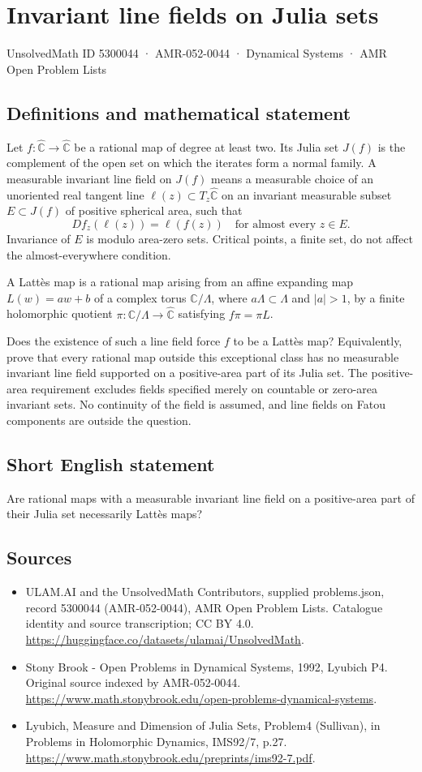 \documentclass[11pt,a4paper]{article}
\begin{document}
\section*{Invariant line fields on Julia sets}\label{5300044}
{\small UnsolvedMath ID 5300044 · AMR-052-0044 · Dynamical Systems · AMR Open Problem Lists}
\subsection{Definitions and mathematical statement}
Let $f:\widehat{\mathbb C}\to\widehat{\mathbb C}$
be a rational map of degree at least two.
Its Julia set $J(f)$ is the complement of
the open set on which the iterates form
a normal family. A measurable invariant
line field on $J(f)$ means a measurable
choice of an unoriented real tangent line
$\ell(z)\subset T_z\widehat{\mathbb C}$ on
an invariant measurable subset $E\subset J(f)$
of positive spherical area, such that
\[
                    Df_z(\ell(z))=\ell(f(z))
                           \quad\text{for almost every }z\in E.
\]
Invariance of $E$ is modulo area-zero sets.
Critical points, a finite set, do not
affect the almost-everywhere condition.

A Latt\`es map is a rational map arising
from an affine expanding map $L(w)=aw+b$
of a complex torus $\mathbb C/\Lambda$,
where $a\Lambda\subset\Lambda$ and $|a|>1$,
by a finite holomorphic quotient
$\pi:\mathbb C/\Lambda\to\widehat{\mathbb C}$
satisfying $f\pi=\pi L$.

Does the existence of such a line field
force $f$ to be a Latt\`es map? Equivalently,
prove that every rational map outside
this exceptional class has no measurable
invariant line field supported on a
positive-area part of its Julia set.
The positive-area requirement excludes fields
specified merely on countable or zero-area
invariant sets. No continuity of the
field is assumed, and line fields on
Fatou components are outside the question.
\subsection{Short English statement}
Are rational maps with a measurable invariant line field on a positive-area part of their Julia set necessarily Lattès maps?
\subsection{Sources}
\begin{itemize}
\item[S1] ULAM.AI and the UnsolvedMath Contributors, supplied problems.json, record 5300044 (AMR-052-0044), AMR Open Problem Lists. Catalogue identity and source transcription; CC BY 4.0.
\url{https://huggingface.co/datasets/ulamai/UnsolvedMath}.
\item[S2] Stony Brook - Open Problems in Dynamical Systems, 1992, Lyubich P4. Original source indexed by AMR-052-0044.
\url{https://www.math.stonybrook.edu/open-problems-dynamical-systems}.
\item[S3] Lyubich, Measure and Dimension of Julia Sets, Problem4 (Sullivan), in Problems in Holomorphic Dynamics, IMS92/7, p.27.
\url{https://www.math.stonybrook.edu/preprints/ims92-7.pdf}.
\end{itemize}
\end{document}
